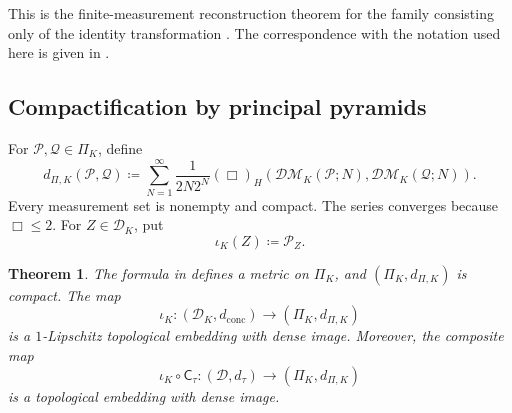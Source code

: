 \documentclass[10pt,a4paper]{amsart}
\newtheorem{theorem}{Theorem}[section]
\newcommand{\D}{\mathcal D}
\newcommand{\DK}{\mathcal D_K}
\newcommand{\DM}{\mathcal{DM}}
\newcommand{\dconc}{d_{\mathrm{conc}}}
\newcommand{\dtau}{d_{\tau}}
\begin{document}
This is the finite-measurement reconstruction theorem for the family consisting only of the identity transformation \cite[Proposition~6.24]{gds2}. The correspondence with the notation used here is given in .

\subsection{Compactification by principal pyramids}
\label{subsec:pyramid-main-compactification}

For $\mathcal P,\mathcal Q\in\Pi_K$, define
\begin{equation}
\label{eq:pyramid-metric}
d_{\Pi,K}(\mathcal P,\mathcal Q)\coloneqq\sum_{N=1}^\infty\frac{1}{2N2^N}(\Box)_H(\DM_K(\mathcal P;N),\DM_K(\mathcal Q;N)).
\end{equation}
Every measurement set is nonempty and compact. The series converges because $\Box\leq2$. For $Z\in\DK$, put
\[
\iota_K(Z)\coloneqq\mathcal P_Z.
\]

\begin{theorem}
\label{thm:K-pyramid-compactification}
The formula in  defines a metric on $\Pi_K$, and $(\Pi_K,d_{\Pi,K})$ is compact. The map
\[
\iota_K\colon(\DK,\dconc)\longrightarrow(\Pi_K,d_{\Pi,K})
\]
is a $1$-Lipschitz topological embedding with dense image. Moreover, the composite map
\[
\iota_K\circ\mathsf C_\tau\colon(\D,\dtau)\longrightarrow(\Pi_K,d_{\Pi,K})
\]
is a topological embedding with dense image.
\end{theorem}
\end{document}
